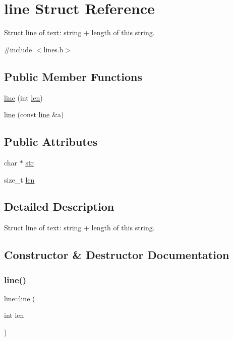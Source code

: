 \hypertarget{structline}{}\section{line Struct Reference}
\label{structline}


Struct line of text\+: string + length of this string.  




{\ttfamily \#include $<$lines.\+h$>$}

\subsection*{Public Member Functions}
\begin{DoxyCompactItemize}
\item 
\mbox{\hyperlink{structline_aafee7e856a4ea7084092f9905a108e1a}{line}} (int \mbox{\hyperlink{structline_a5c7cb645047f41a604a90acc93757324}{len}})
\item 
\mbox{\hyperlink{structline_aec404eb5f8e12154642b1efee43dca4b}{line}} (const \mbox{\hyperlink{structline}{line}} \&a)
\end{DoxyCompactItemize}
\subsection*{Public Attributes}
\begin{DoxyCompactItemize}
\item 
char $\ast$ \mbox{\hyperlink{structline_ab000f729df2892e18ff773ad903b2254}{str}}
\item 
size\+\_\+t \mbox{\hyperlink{structline_a5c7cb645047f41a604a90acc93757324}{len}}
\end{DoxyCompactItemize}


\subsection{Detailed Description}
Struct line of text\+: string + length of this string. 

\subsection{Constructor \& Destructor Documentation}
\mbox{\label{structline_aafee7e856a4ea7084092f9905a108e1a}} 
\subsubsection{\texorpdfstring{line()}{line()}\hspace{0.1cm}{\footnotesize\ttfamily [1/2]}}
{\footnotesize\ttfamily line\+::line (\begin{DoxyParamCaption}\item[{int}]{len }\end{DoxyParamCaption})\hspace{0.3cm}{\ttfamily [inline]}}


